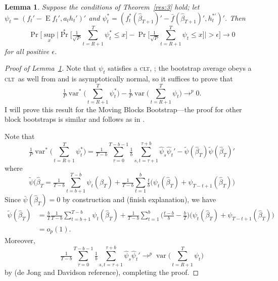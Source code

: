 \documentclass[11pt,fleqn]{article}
\newtheorem{lema}{Lemma}[section]
\theoremstyle{definition}
\DeclareMathOperator{\E}{E}
\DeclareMathOperator{\var}{var}
\DeclareMathOperator{\pr}{Pr}
\newcommand{\clt}{\textsc{clt}}
\begin{document}
\begin{lema}\label{res:a3}
  Suppose the conditions of Theorem~\ref{res:3} hold; let $\psi_{t} =
  (f_{t}' - \E f_{t}', a_t h_{t}')'$ and $\psi_t^{*} =
  (f_t^{*}(\hat{\beta}_{T+1})' - \bar{f}(\hat{\beta}_{T+1})',
  h_t^{*\prime})'$.  Then
  \begin{equation}\label{eq:1}
    \pr\Big[\sup_x \Big| \pr^{*}\Big[ \tfrac{1}{\sqrt{P}} \sum_{t=R+1}^T \psi_{t}^{*}
    \leq x \Big] - \pr\Big[ \tfrac{1}{\sqrt{P}} \sum_{t=R+1}^T \psi_{t}
    \leq x \Big] \Big| > \epsilon \Big] \to 0
  \end{equation}
  for all positive $\epsilon$.
\end{lema}

\begin{proof}[Proof of Lemma~\ref{res:a3}]
  Note that $\psi_t$ satisfies a \clt, \citep[Theorem~2]{Jon:97}; the
  bootstrap average obeys a \clt\ as well from
  \citet[Theorem~2]{Cal:11d} and is asymptotically normal, so it
  suffices to prove that
  \[ \tfrac{ 1 }{ P } \var^* \Big( \sum_{t=R+1}^T \psi_t^* \Big) -
  \tfrac{ 1 }{ P } \var \Big( \sum_{t=R+1}^T \psi_t \Big) \to^p 0. \]
  I will prove this result for the Moving Blocks Bootstrap---the proof
  for other block bootstraps is similar and follows as in
  \cite{Cal:11d}.

  \newcommand{\su}{\tfrac{ 1 }{ T - b } \sum_{ \tau = 0 }^{ T - b - 1
    } \tfrac{ 1 }{ b }\sum_{ s, t = \tau + 1 }^{ \tau + b }}

  Note that
  \begin{equation*}
  \tfrac{ 1 }{ P } \var^* \Big( \sum_{t=R+1}^T \psi_t^* \Big)
  = \su \hat\psi_s \hat\psi_t'
     - \tilde \psi( \hat \beta_T ) \tilde \psi( \hat \beta_T )'
  \end{equation*}
  where
  \begin{equation*}
    \tilde \psi( \hat \beta_T
    = \tfrac{ 1 }{ T - b } \sum_{ t = b + 1 }^{ T - b } \psi_t( \hat \beta_T )
       + \tfrac{ 1 }{ T - b } \sum_{ t = 1 }^b \tfrac{ t }{ b }
         \big( \psi_t( \hat \beta_T ) + \psi_{ T - t + 1 }( \hat \beta_T ) \big)
  \end{equation*}
  Since $\bar \psi( \hat \beta_T ) = 0$ by construction and (finish explanation), we have
  \begin{align*}
    \tilde \psi( \hat \beta_T )
    &= \tfrac{ b }{ T } \tfrac{ 1 }{ T - b } \sum_{ t = b + 1 }^{ T - b } \psi_t( \hat \beta_T )
       + \tfrac{ 1 }{ T - b } \sum_{ t = 1 }^b 
       \Big( \tfrac{ t - b }{ b } - \tfrac{ b }{ T } \Big)
       \big( \psi_t( \hat \beta_T ) + \psi_{ T - t + 1 }( \hat \beta_T ) \big) \\
    &= o_p(1).
  \end{align*}
  Moreover,
  \begin{equation*}
    \su \hat\psi_s \hat\psi_t' \to^p \var \Big( \sum_{t=R+1}^T \psi_t \Big)
  \end{equation*}
  by (de Jong and Davidson reference), completing the proof.
\end{proof}
\end{document}
